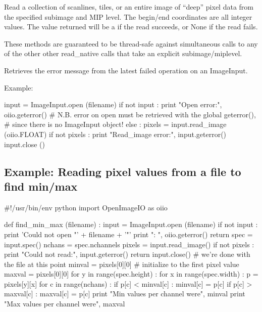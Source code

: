 \NEW %
Read a collection of scanlines, tiles, or an entire image of ``deep'' pixel
data from the specified subimage and MIP level. The begin/end coordinates
are all integer values. The value returned will be a \DeepData if the read
succeeds, or {\cf None} if the read fails.

These methods are guaranteed to be thread-safe against simultaneous calls to
any of the other other {\cf read_native} calls that take an explicit
subimage/miplevel.
\apiend

Retrieves the error message from the latest failed operation on an
ImageInput.

\noindent Example:
\begin{code}
    input = ImageInput.open (filename)
    if not input :
        print "Open error:", oiio.geterror()
        # N.B. error on open must be retrieved with the global geterror(),
        # since there is no ImageInput object!
    else :
        pixels = input.read_image (oiio.FLOAT)
        if not pixels :
            print "Read_image error:", input.geterror()
        input.close ()
\end{code}
\apiend

\newpage
\subsection*{Example: Reading pixel values from a file to find min/max}

\begin{code}
#!/usr/bin/env python 
import OpenImageIO as oiio

def find_min_max (filename) :
    input = ImageInput.open (filename)
    if not input :
        print 'Could not open "' + filename + '"'
        print "\tError: ", oiio.geterror()
        return
    spec = input.spec()
    nchans = spec.nchannels
    pixels = input.read_image()
    if not pixels :
        print "Could not read:", input.geterror()
        return
    input.close()    # we're done with the file at this point
    minval = pixels[0][0]   # initialize to the first pixel value
    maxval = pixels[0][0]
    for y in range(spec.height) :
        for x in range(spec.width) :
            p = pixels[y][x]
            for c in range(nchans) :
                if p[c] < minval[c] :
                    minval[c] = p[c]
                if p[c] > maxval[c] :
                    maxval[c] = p[c]
    print "Min values per channel were", minval
    print "Max values per channel were", maxval
\end{code}
\newpage


